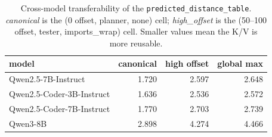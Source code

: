 \begin{table}[t]
\centering
\small
\caption{Cross-model transferability of the \texttt{predicted\_distance\_table}. \emph{canonical} is the (0 offset, planner, none) cell; \emph{high\_offset} is the (50--100 offset, tester, imports\_wrap) cell. Smaller values mean the K/V is more reusable.}\label{tab:cross-model-summary}
\begin{tabular}{lrrr}
\toprule
model & canonical & high offset & global max \\
\midrule
Qwen2.5-7B-Instruct & 1.720 & 2.597 & 2.648 \\
Qwen2.5-Coder-3B-Instruct & 1.636 & 2.536 & 2.572 \\
Qwen2.5-Coder-7B-Instruct & 1.770 & 2.703 & 2.739 \\
Qwen3-8B & 2.898 & 4.274 & 4.466 \\
\bottomrule
\end{tabular}
\end{table}
